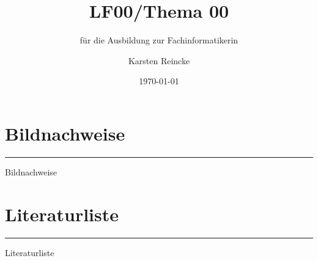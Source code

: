 \documentclass[]{beamer}
\title{LF00/Thema 00}
\subtitle{für die Ausbildung zur Fachinformatikerin}
\institute{GS-LDK}
\author{Karsten Reincke}
\date{\today}
\def\cfgGl{../../../cfg.gl/}
\begin{document}

\begin{frame}
  \titlepage
\end{frame}








\logo{}
\newpage

\section{Bildnachweise}
\noindent\rule{\linewidth}{0.4pt}

\begin{small}Bildnachweise\end{small}

\vspace{0.22cm}
\begin{tiny}
 
\end{tiny}

\newpage
\section{Literaturliste}
\noindent\rule{\linewidth}{0.4pt}

\begin{small}Literaturliste\end{small}

\vspace{0.22cm}
\printbibliography
\end{document}
